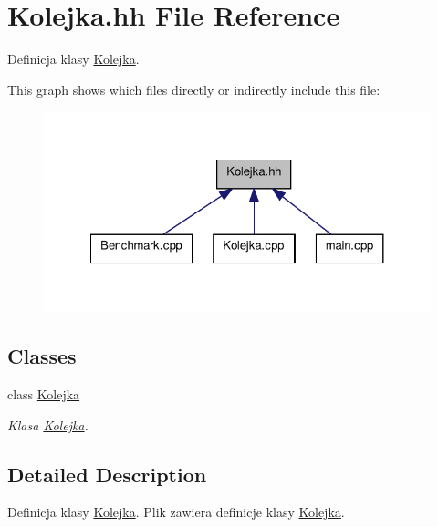 \hypertarget{a00011}{\section{Kolejka.\-hh File Reference}
\label{a00011}
}


Definicja klasy \hyperlink{a00003}{Kolejka}.  


This graph shows which files directly or indirectly include this file\-:\nopagebreak
\begin{figure}[H]
\begin{center}
\leavevmode
\includegraphics[width=324pt]{a00025}
\end{center}
\end{figure}
\subsection*{Classes}
\begin{DoxyCompactItemize}
\item 
class \hyperlink{a00003}{Kolejka}
\begin{DoxyCompactList}\small\item\em Klasa \hyperlink{a00003}{Kolejka}. \end{DoxyCompactList}\end{DoxyCompactItemize}


\subsection{Detailed Description}
Definicja klasy \hyperlink{a00003}{Kolejka}. Plik zawiera definicje klasy \hyperlink{a00003}{Kolejka}. 